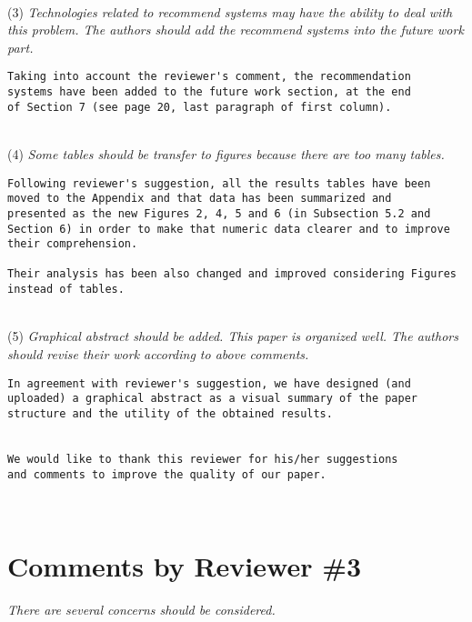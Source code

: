 \documentclass[preprint]{elsarticle}
\begin{document}
~\\
\noindent (3) \emph{Technologies related to recommend systems may have the ability to deal with this problem. The authors should add the recommend systems into the future work part. } 

\begin{verbatim}
Taking into account the reviewer's comment, the recommendation 
systems have been added to the future work section, at the end 
of Section 7 (see page 20, last paragraph of first column).
\end{verbatim}


~\\
\noindent (4) \emph{Some tables should be transfer to figures because there are too many tables. } 

\begin{verbatim}
Following reviewer's suggestion, all the results tables have been 
moved to the Appendix and that data has been summarized and 
presented as the new Figures 2, 4, 5 and 6 (in Subsection 5.2 and 
Section 6) in order to make that numeric data clearer and to improve 
their comprehension.

Their analysis has been also changed and improved considering Figures 
instead of tables.
\end{verbatim}


~\\
\noindent (5) \emph{Graphical abstract should be added. This paper is organized well. The authors should revise their work according to above comments. } 

\begin{verbatim}
In agreement with reviewer's suggestion, we have designed (and 
uploaded) a graphical abstract as a visual summary of the paper 
structure and the utility of the obtained results.


We would like to thank this reviewer for his/her suggestions 
and comments to improve the quality of our paper.
\end{verbatim}

~\\


\section{Comments by Reviewer \#3}

\noindent \emph{There are several concerns should be considered.}\\
\end{document}
